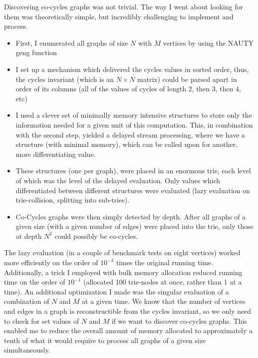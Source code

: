 Discovering co-cycles graphs was not trivial.
The way I went about looking for them was theoretically simple, but incredibly challenging to implement and process.
\begin{itemize}
\item{First, I enumerated all graphs of size $N$ with $M$ vertices by using the NAUTY geng function}
\item{I set up a mechanism which delivered the cycles values in sorted order, thus, the cycles invariant (which is an $N \times N$ matrix) could be parsed apart in order of its columns (all of the values of cycles of length 2, then 3, then 4, etc)}
\item{I used a clever set of minimally memory intensive structures to store only the information needed for a given unit of this computation.  This, in combination with the second step, yielded a delayed stream processing, where we have a structure (with minimal memory), which can be called upon for another, more differentiating value.}
\item{These structures (one per graph), were placed in an enormous trie, each level of which was the level of the delayed evaluation.  Only values which differentiated between different structures were evaluated (lazy evaluation on trie-collision, splitting into sub-tries).}
\item{Co-Cycles graphs were then simply detected by depth. After all graphs of a given size (with a given number of edges) were placed into the trie, only those at depth $N^2$ could possibly be co-cycles.}
\end{itemize}

The lazy evaluation (in a couple of benchmark tests on eight vertices) worked more efficiently on the order of $10^{-3}$ times the original running time.
Additionally, a trick I employed with bulk memory allocation reduced running time on the order of $10^{-1}$ (allocated 100 trie-nodes at once, rather than 1 at a time).
An additional optimization I made was the singular evaluation of a combination of $N$ and $M$ at a given time.
We know that the number of vertices and edges in a graph is reconstructible from the cycles invariant, so we only need to check for set values of $N$ and $M$ if we want to discover co-cycles graphs.
This enabled me to reduce the overall amount of memory allocated to approximately a tenth of what it would require to process all graphs of a given size simultaneously.

